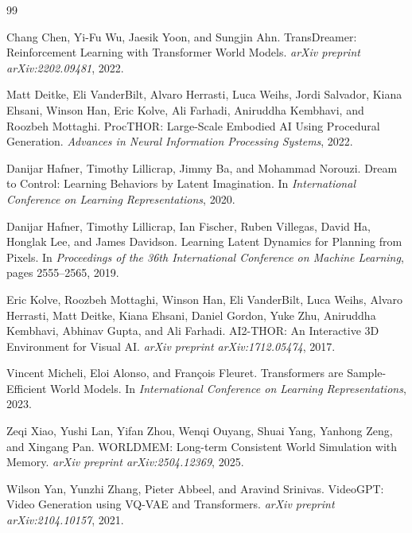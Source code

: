 \documentclass[10pt,twocolumn,letterpaper]{article}
\begin{document}
\begin{thebibliography}{99}

Chang Chen, Yi-Fu Wu, Jaesik Yoon, and Sungjin Ahn.
TransDreamer: Reinforcement Learning with Transformer World Models.
\textit{arXiv preprint arXiv:2202.09481}, 2022.

Matt Deitke, Eli VanderBilt, Alvaro Herrasti, Luca Weihs, Jordi Salvador, Kiana Ehsani, Winson Han, Eric Kolve, Ali Farhadi, Aniruddha Kembhavi, and Roozbeh Mottaghi.
ProcTHOR: Large-Scale Embodied AI Using Procedural Generation.
\textit{Advances in Neural Information Processing Systems}, 2022.

Danijar Hafner, Timothy Lillicrap, Jimmy Ba, and Mohammad Norouzi.
Dream to Control: Learning Behaviors by Latent Imagination.
In \textit{International Conference on Learning Representations}, 2020.

Danijar Hafner, Timothy Lillicrap, Ian Fischer, Ruben Villegas, David Ha, Honglak Lee, and James Davidson.
Learning Latent Dynamics for Planning from Pixels.
In \textit{Proceedings of the 36th International Conference on Machine Learning}, pages 2555--2565, 2019.

Eric Kolve, Roozbeh Mottaghi, Winson Han, Eli VanderBilt, Luca Weihs, Alvaro Herrasti, Matt Deitke, Kiana Ehsani, Daniel Gordon, Yuke Zhu, Aniruddha Kembhavi, Abhinav Gupta, and Ali Farhadi.
AI2-THOR: An Interactive 3D Environment for Visual AI.
\textit{arXiv preprint arXiv:1712.05474}, 2017.

Vincent Micheli, Eloi Alonso, and Fran\c{c}ois Fleuret.
Transformers are Sample-Efficient World Models.
In \textit{International Conference on Learning Representations}, 2023.

Zeqi Xiao, Yushi Lan, Yifan Zhou, Wenqi Ouyang, Shuai Yang, Yanhong Zeng, and Xingang Pan.
WORLDMEM: Long-term Consistent World Simulation with Memory.
\textit{arXiv preprint arXiv:2504.12369}, 2025.

Wilson Yan, Yunzhi Zhang, Pieter Abbeel, and Aravind Srinivas.
VideoGPT: Video Generation using VQ-VAE and Transformers.
\textit{arXiv preprint arXiv:2104.10157}, 2021.

\end{thebibliography}
\end{document}
